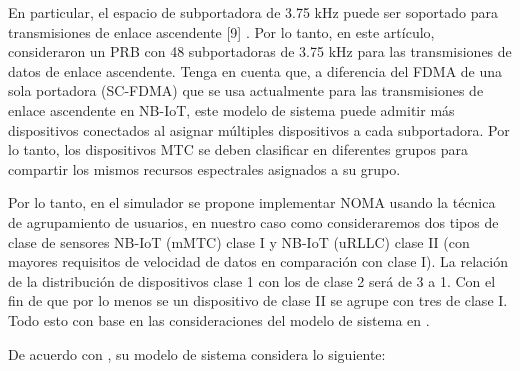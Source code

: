 En particular, el espacio de subportadora de 3.75 kHz puede ser soportado para transmisiones de enlace ascendente [9] . Por lo tanto, en este artículo, consideraron un PRB con 48 subportadoras de 3.75 kHz para las transmisiones de datos de enlace ascendente. Tenga en cuenta que, a diferencia del FDMA de una sola portadora (SC-FDMA) que se usa actualmente para las transmisiones de enlace ascendente en NB-IoT, este modelo de sistema puede admitir más dispositivos conectados al asignar múltiples dispositivos a cada subportadora. Por lo tanto, los dispositivos MTC se deben clasificar en diferentes grupos para compartir los mismos recursos espectrales asignados a su grupo.\newline

Por lo tanto, en el simulador se propone implementar NOMA usando la técnica de agrupamiento de usuarios, en nuestro caso como consideraremos dos tipos de clase de sensores NB-IoT (mMTC) clase I y NB-IoT (uRLLC) clase II (con mayores requisitos de velocidad de datos en comparación con clase I). La relación de la distribución de dispositivos clase 1 con los de clase 2 será de 3 a 1. Con el fin de que por lo menos se un dispositivo de clase II se agrupe con tres de clase I. Todo esto con base en las consideraciones del modelo de sistema en \parencite{Shahini2019}.\newline

De acuerdo con \parencite{Shahini2019}, su modelo de sistema considera lo siguiente:\label{VariablesSHahini}


